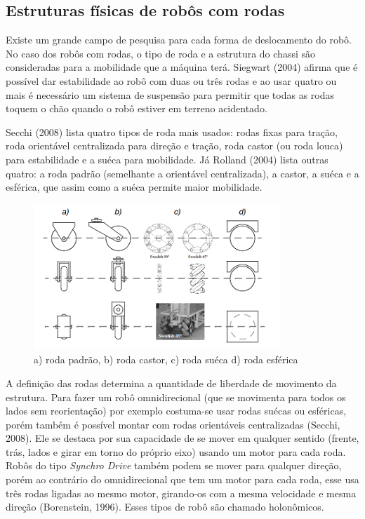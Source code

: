 \subsection{Estruturas físicas de robôs com rodas}

Existe um grande campo de pesquisa para cada forma de deslocamento do robô. No caso dos robôs com rodas, o tipo de roda e a estrutura do chassi são consideradas para a mobilidade que a máquina terá. Siegwart (2004) afirma que é possível dar estabilidade ao robô com duas ou três rodas e ao usar quatro ou mais é necessário um sistema de suspensão para permitir que todas as rodas toquem o chão quando o robô estiver em terreno acidentado.

Secchi (2008) lista quatro tipos de roda mais usados: rodas fixas para tração, roda orientável centralizada para direção e tração, roda castor (ou roda louca) para estabilidade e a suéca para mobilidade. Já Rolland (2004) lista outras quatro: a roda padrão (semelhante a orientável centralizada), a castor, a suéca e a esférica, que assim como a suéca permite maior mobilidade.

\begin{figure}[h]
	\centering
	\label{fig02}
		\includegraphics[keepaspectratio=true,scale=1]{figuras/1rodas.png}
	\caption{a) roda padrão, b) roda castor, c) roda suéca d) roda esférica}
\end{figure}

A definição das rodas determina a quantidade de liberdade de movimento da estrutura. Para fazer um robô omnidirecional (que se movimenta para todos os lados sem reorientação) por exemplo costuma-se usar rodas suécas ou esféricas, porém também é possível montar com rodas orientáveis centralizadas (Secchi, 2008). Ele se destaca por sua capacidade de se mover em qualquer sentido (frente, trás, lados e girar em torno do próprio eixo) usando um motor para cada roda. Robôs do tipo \textit{Synchro Drive} também podem se mover para qualquer direção, porém ao contrário do omnidirecional que tem um motor para cada roda, esse usa três rodas ligadas ao mesmo motor, girando-os com a mesma velocidade e mesma direção (Borenstein, 1996). Esses tipos de robô são chamado holonômicos.

